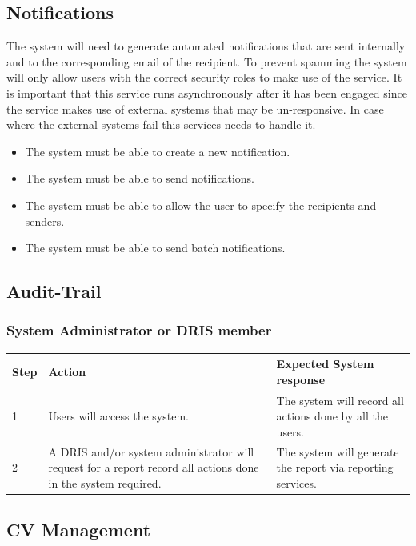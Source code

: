\documentclass[12pt]{article}
\begin{document}
\subsection{Notifications}
The system will need to generate automated notifications that are sent internally and to
the corresponding email of the recipient. To prevent spamming the system will only allow
users with the correct security roles to make use of the service. It is important that this
service runs asynchronously after it has been engaged since the service makes use of external
systems that may be un-responsive. In case where the external systems fail this services
needs to handle it.
\begin{itemize}
\item
The system must be able to create a new notification.
\item
The system must be able to send notifications.
\item
The system must be able to allow the user to specify the recipients and senders.
\item
The system must be able to send batch notifications.
\end{itemize}

\subsection{Audit-Trail}
\subsubsection{System Administrator or DRIS member}
\begin{center}
\begin{tabular}{|l|p{6cm}|p{8cm}|}
\hline
Step & Action & Expected System response \\
\hline
1 & Users will access the system. & The system will record all actions done by all the users. \\
\hline


2 & A DRIS and/or system administrator will request for a report record all actions done in the system required. & The system will generate the report via reporting services. \\
\hline
\end{tabular}
\end{center}
\subsection{CV Management}
\end{document}

